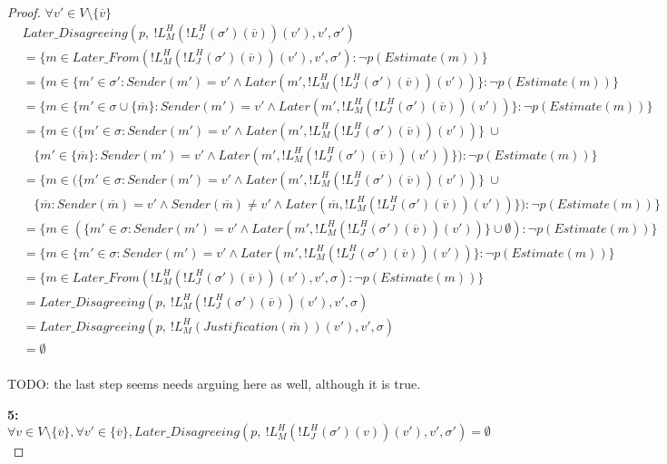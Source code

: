 \begin{proof}
$\forall v' \in V \setminus \{\overline{v}\}$
\begin{align}
  &Later\_Disagreeing(p,~!L^H_M(!L^H_J(\sigma')(\overline{v}))(v'), v', \sigma') \\
  &= \{m \in Later\_From(!L^H_M(!L^H_J(\sigma')(\overline{v}))(v'), v', \sigma') : \neg p(Estimate(m)) \} \\
  &= \{m \in \{m' \in \sigma' : Sender(m') = v' \land Later(m', !L^H_M(!L^H_J(\sigma')(\overline{v}))(v'))\} : \neg p(Estimate(m)) \} \\
  &= \{m \in \{m' \in \sigma \cup \{\overline{m}\} : Sender(m') = v' \land Later(m', !L^H_M(!L^H_J(\sigma')(\overline{v}))(v'))\} : \neg p(Estimate(m)) \} \\
  &= \{m \in \big(\{m' \in \sigma : Sender(m') = v' \land Later(m', !L^H_M(!L^H_J(\sigma')(\overline{v}))(v'))\}~ \cup \\
  &~~~~\{m' \in \{\overline{m}\} : Sender(m') = v' \land Later(m', !L^H_M(!L^H_J(\sigma')(\overline{v}))(v'))\}\big) : \neg p(Estimate(m)) \} \\
  &= \{m \in \big(\{m' \in \sigma : Sender(m') = v' \land Later(m', !L^H_M(!L^H_J(\sigma')(\overline{v}))(v'))\}~ \cup \\
  &~~~~\{\overline{m} : Sender(\overline{m}) = v' \land Sender(\overline{m}) \neq v' \land Later(\overline{m}, !L^H_M(!L^H_J(\sigma')(\overline{v}))(v'))\}\big) : \neg p(Estimate(m)) \} \\
  &= \{m \in (\{m' \in \sigma : Sender(m') = v' \land Later(m', !L^H_M(!L^H_J(\sigma')(\overline{v}))(v'))\} \cup \emptyset) : \neg p(Estimate(m)) \} \\
  &= \{m \in \{m' \in \sigma : Sender(m') = v' \land Later(m', !L^H_M(!L^H_J(\sigma')(\overline{v}))(v'))\} : \neg p(Estimate(m)) \} \\
  &= \{m \in Later\_From(!L^H_M(!L^H_J(\sigma')(\overline{v}))(v'), v', \sigma) : \neg p(Estimate(m)) \} \\
  &= Later\_Disagreeing(p,~!L^H_M(!L^H_J(\sigma')(\overline{v}))(v'), v', \sigma) \\
  &= Later\_Disagreeing(p,~!L^H_M(Justification(\overline{m}))(v'), v', \sigma) \\
  &= \emptyset \\
\end{align}

TODO: the last step seems needs arguing here as well, although it is true.

\textbf{5:} $\forall v \in V \setminus \{\overline{v}\}, \forall v' \in \{\overline{v}\}, Later\_Disagreeing(p,~!L^H_M(!L^H_J(\sigma')(v))(v'), v', \sigma') = \emptyset$



\end{proof}
